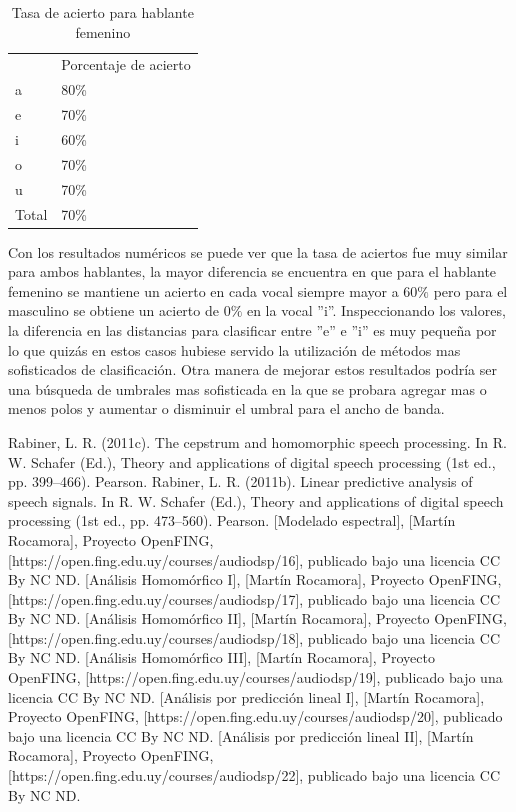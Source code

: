 \documentclass[a4paper]{article}
\begin{document}
\begin{table}[!h]
\centering
\begin{tabular}{ll}
      & Porcentaje de acierto \\
a     & 80\%                  \\
e     & 70\%                  \\
i     & 60\%                  \\
o     & 70\%                  \\
u     & 70\%                  \\
Total & 70\%                 
\end{tabular}
\caption{Tasa de acierto para hablante femenino}
\label{tcecilia}
\end{table}

Con los resultados numéricos se puede ver que la tasa de aciertos fue muy similar para ambos hablantes, la mayor diferencia se encuentra en que para el hablante femenino se mantiene un acierto en cada vocal siempre mayor a $60\%$ pero para el masculino se obtiene un acierto de $0\%$ en la vocal ''i''. Inspeccionando los valores, la diferencia en las distancias para clasificar entre ''e'' e ''i'' es muy pequeña por lo que quizás en estos casos hubiese servido la utilización de métodos mas sofisticados de clasificación. Otra manera de mejorar estos resultados podría ser una búsqueda de umbrales mas sofisticada en la que se probara agregar mas o menos polos y aumentar o disminuir el umbral para el ancho de banda.


\newpage
\begin{thebibliography}{100} %
\addtolength{\leftmargin}{0.2in} %
\setlength{\itemindent}{-0.2in}
Rabiner, L. R. (2011c). The cepstrum and homomorphic speech processing. In R. W. Schafer (Ed.), Theory and applications of digital speech processing (1st ed., pp. 399–466). Pearson.
 Rabiner, L. R. (2011b). Linear predictive analysis of speech signals. In R. W. Schafer (Ed.), Theory and applications of digital speech processing (1st ed., pp. 473–560). Pearson.
 [Modelado espectral], [Martín Rocamora], Proyecto OpenFING, [https://open.fing.edu.uy/courses/audiodsp/16], publicado bajo una licencia CC By NC ND.
[Análisis Homomórfico I], [Martín Rocamora], Proyecto OpenFING, [https://open.fing.edu.uy/courses/audiodsp/17], publicado bajo una licencia CC By NC ND.
[Análisis Homomórfico II], [Martín Rocamora], Proyecto OpenFING, [https://open.fing.edu.uy/courses/audiodsp/18], publicado bajo una licencia CC By NC ND.
[Análisis Homomórfico III], [Martín Rocamora], Proyecto OpenFING, [https://open.fing.edu.uy/courses/audiodsp/19], publicado bajo una licencia CC By NC ND.
[Análisis por predicción lineal I], [Martín Rocamora], Proyecto OpenFING, [https://open.fing.edu.uy/courses/audiodsp/20], publicado bajo una licencia CC By NC ND.
[Análisis por predicción lineal II], [Martín Rocamora], Proyecto OpenFING, [https://open.fing.edu.uy/courses/audiodsp/22], publicado bajo una licencia CC By NC ND.
\end{thebibliography}
\end{document}
